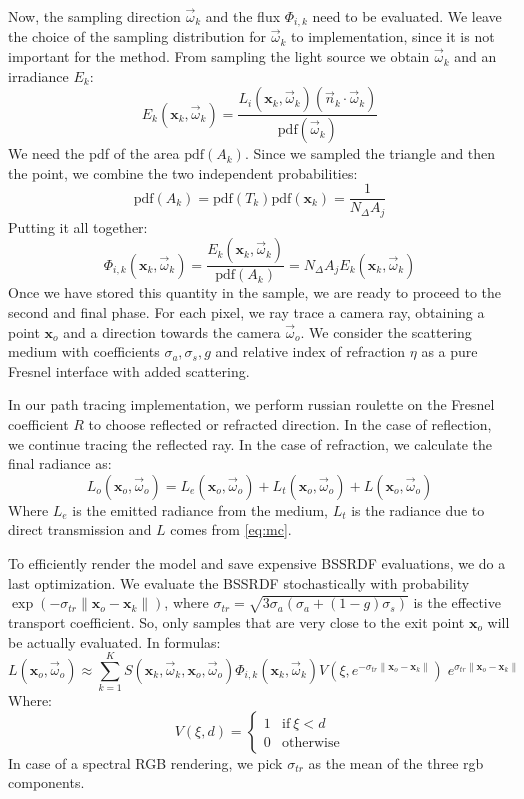 \documentclass[10pt,a4paper]{article}
\begin{document}
Now, the sampling direction $\vec{\omega}_k$ and the flux $\Phi_{i,k}$ need to be evaluated. We leave the choice of the sampling distribution for $\vec{\omega}_k$ to implementation, since it is not important for the method. From sampling the light source we obtain $\vec{\omega}_k$ and an irradiance $E_k$:
$$
E_k(\mathbf{x}_k, \vec{\omega}_k) = \frac{L_i(\mathbf{x}_k, \vec{\omega}_k) (\vec{n}_k \cdot \vec{\omega}_k)}{\text{pdf}(\vec{\omega}_k)}
$$
We need the pdf of the area $\text{pdf}(A_k)$. Since we sampled the triangle and then the point, we combine the two independent probabilities:
$$
\text{pdf}(A_k) = \text{pdf}(T_k) \text{pdf}(\mathbf{x}_k) = \frac{1}{N_\Delta A_j} 
$$
Putting it all together:
$$
\Phi_{i,k}(\mathbf{x}_k, \vec{\omega}_k)  = \frac{E_k(\mathbf{x}_k, \vec{\omega}_k) }{\text{pdf}(A_k)} = N_\Delta A_j E_k(\mathbf{x}_k, \vec{\omega}_k)
$$
Once we have stored this quantity in the sample, we are ready to proceed to the second and final phase. For each pixel, we ray trace a camera ray, obtaining a point $\mathbf{x}_o$ and a direction towards the camera $\vec{\omega}_o$. We consider the scattering medium with coefficients $\sigma_a, \sigma_s, g$ and relative index of refraction $\eta$ as a pure Fresnel interface with added scattering. 

In our path tracing implementation, we perform russian roulette on the Fresnel coefficient $R$ to choose reflected or refracted direction. In the case of reflection, we continue tracing the reflected ray. In the case of refraction, we calculate the final radiance as:
$$
L_o(\mathbf{x}_o, \vec{\omega}_o) = L_e(\mathbf{x}_o, \vec{\omega}_o) + L_t(\mathbf{x}_o, \vec{\omega}_o) + L(\mathbf{x}_o, \vec{\omega}_o) 
$$
Where $L_e$ is the emitted radiance from the medium, $L_t$ is the radiance due to direct transmission and $L$ comes from \ref{eq:mc}. 

To efficiently render the model and save expensive BSSRDF evaluations, we do a last optimization. We evaluate the BSSRDF stochastically with probability $\exp(-\sigma_{tr} \| \mathbf{x}_o - \mathbf{x}_k \|)$, where $\sigma_{tr} = \sqrt{3 \sigma_a (\sigma_a + (1-g) \sigma_s)} $ is the effective transport coefficient.  So, only samples that are very close to the exit point $\mathbf{x}_o$ will be actually evaluated. In formulas:
\begin{equation*}
L(\mathbf{x}_o, \vec{\omega}_o) \approx  \sum_{k = 1}^K S(\mathbf{x}_k, \vec{\omega}_k, \mathbf{x}_o, \vec{\omega}_o) \Phi_{i,k}(\mathbf{x}_k, \vec{\omega}_k) V(\xi, e^{-\sigma_{tr} \| \mathbf{x}_o - \mathbf{x}_k \|})\; e^{\sigma_{tr} \| \mathbf{x}_o - \mathbf{x}_k \|}
\end{equation*}
Where:
$$
V(\xi, d) = \begin{cases}
1 & \text{if} \ \xi < d \\
0 & \text{otherwise}
\end{cases}
$$
In case of a spectral RGB rendering, we pick $\sigma_{tr}$ as the mean of the three rgb components. 
\end{document}

